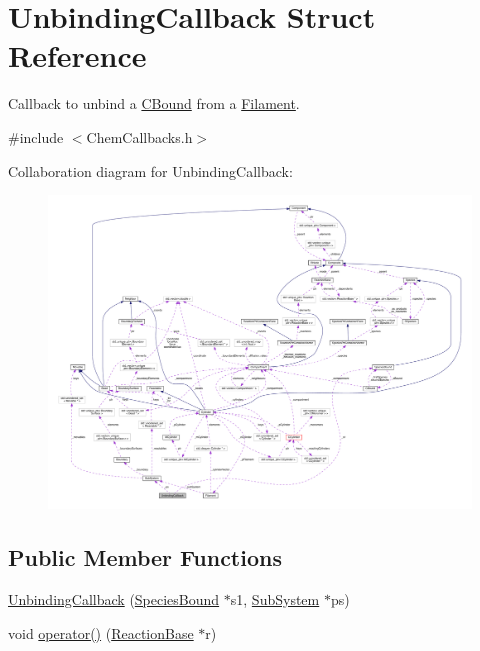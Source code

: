 \hypertarget{structUnbindingCallback}{\section{Unbinding\+Callback Struct Reference}
\label{structUnbindingCallback}
}


Callback to unbind a \hyperlink{classCBound}{C\+Bound} from a \hyperlink{classFilament}{Filament}.  




{\ttfamily \#include $<$Chem\+Callbacks.\+h$>$}



Collaboration diagram for Unbinding\+Callback\+:
\nopagebreak
\begin{figure}[H]
\begin{center}
\leavevmode
\includegraphics[width=350pt]{structUnbindingCallback__coll__graph}
\end{center}
\end{figure}
\subsection*{Public Member Functions}
\begin{DoxyCompactItemize}
\item 
\hyperlink{structUnbindingCallback_af56dfa37467fed8f79f345b8ab85fedd}{Unbinding\+Callback} (\hyperlink{classSpeciesBound}{Species\+Bound} $\ast$s1, \hyperlink{classSubSystem}{Sub\+System} $\ast$ps)
\item 
void \hyperlink{structUnbindingCallback_a9e2633d821ddd1442cb89561f3212eab}{operator()} (\hyperlink{classReactionBase}{Reaction\+Base} $\ast$r)
\end{DoxyCompactItemize}
